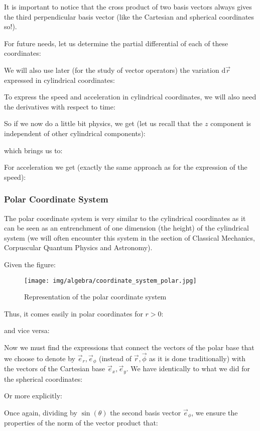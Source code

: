 	\begin{tcolorbox}[title=Remark,colframe=black,arc=10pt]
	It is important to notice that the cross product of two basis vectors always gives the third perpendicular  basis vector (like the Cartesian and spherical coordinates so!).
	\end{tcolorbox}
	For future needs, let us determine the partial differential of each of these coordinates:
	
	We will also use later (for the study of vector operators) the variation $\mathrm{d}\vec{r}$ expressed in cylindrical coordinates:
	
	To express the speed and acceleration in cylindrical coordinates, we will also need the derivatives with respect to time:
	
	So if we now do a little bit physics, we get (let us recall that the $z$ component is independent of other cylindrical components):
	
	which brings us to:
	
	For acceleration we get (exactly the same approach as for the expression of the speed):
	
	
	\subsubsection{Polar Coordinate System}
	The polar coordinate system is very similar to the cylindrical coordinates as it can be seen as an entrenchment of one dimension (the height) of the cylindrical system (we will often encounter this system in the section of Classical Mechanics, Corpuscular Quantum Physics and Astronomy).

	Given the figure:
	\begin{figure}[H]
		\centering
		\texttt{[image: img/algebra/coordinate\_system\_polar.jpg]}
		\caption{Representation of the polar coordinate system}
	\end{figure}
	Thus, it comes easily in polar coordinates for $r>0$:
	
	and vice versa:
	
	Now we must find the expressions that connect the vectors of the polar base that we choose to denote by $\vec{e}_r,\vec{e}_\phi$ (instead of $\vec{r}, \vec{\phi}$ as it is done traditionally) with the vectors of the Cartesian base $\vec{e}_x,\vec{e}_y$. We have identically to what we did for the spherical coordinates:
	
	Or more explicitly:
	
	Once again, dividing by $\sin(\theta)$ the second basis vector $\vec{e}_\phi$, we ensure the properties of the norm of the vector product that:
	
